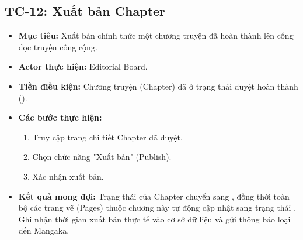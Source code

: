 \subsection{TC-12: Xuất bản Chapter}
\label{subsec:tc12_publish_chapter}
\begin{itemize}
    \item \textbf{Mục tiêu:} Xuất bản chính thức một chương truyện đã hoàn thành lên cổng đọc truyện công cộng.
    \item \textbf{Actor thực hiện:} Editorial Board.
    \item \textbf{Tiền điều kiện:} Chương truyện (Chapter) đã ở trạng thái duyệt hoàn thành ().
    \item \textbf{Các bước thực hiện:}
    \begin{enumerate}
        \item Truy cập trang chi tiết Chapter đã duyệt.
        \item Chọn chức năng "Xuất bản" (Publish).
        \item Xác nhận xuất bản.
    \end{enumerate}
    \item \textbf{Kết quả mong đợi:} Trạng thái của Chapter chuyển sang , đồng thời toàn bộ các trang vẽ (Pages) thuộc chương này tự động cập nhật sang trạng thái . Ghi nhận thời gian xuất bản thực tế vào cơ sở dữ liệu và gửi thông báo loại  đến Mangaka.
\end{itemize}

